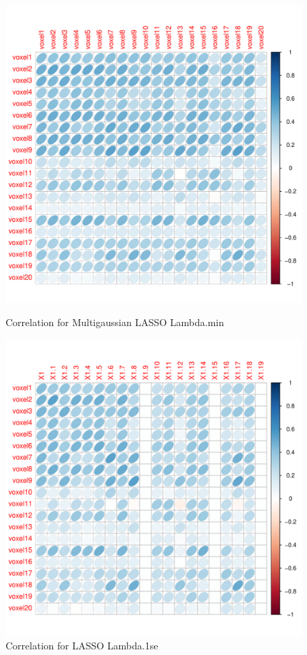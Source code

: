 \documentclass[english]{amsart}
\begin{document}
\vspace{-5mm}
\begin{figure}[H]
  \includegraphics[width=\linewidth]{corrplot_mg.pdf}
    \caption{Correlation for Multigaussian LASSO Lambda.min}
\endminipage\hfill
\vspace{-5mm}
  \includegraphics[width=\linewidth]{corrplot_1se.pdf}
    \caption{Correlation for LASSO Lambda.1se}
\endminipage


\end{figure}
\end{document}
